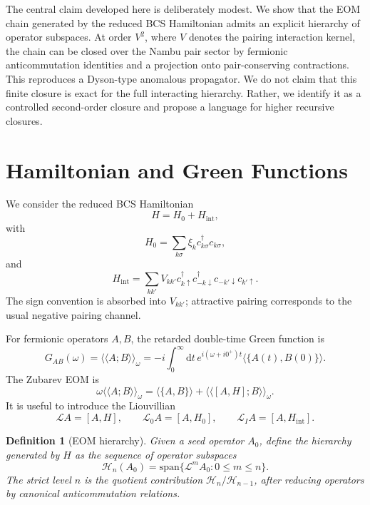 \documentclass[aps,prb,reprint,superscriptaddress,nofootinbib]{revtex4-2}
\newtheorem{definition}{Definition}
\newcommand{\Liouv}{\mathcal{L}}
\newcommand{\Hh}{\mathcal{H}}
\newcommand{\dif}{\mathrm{d}}
\begin{document}
The central claim developed here is deliberately modest. We show that the EOM chain generated by the reduced BCS Hamiltonian admits an explicit hierarchy of operator subspaces. At order \(V^2\), where \(V\) denotes the pairing interaction kernel, the chain can be closed over the Nambu pair sector by fermionic anticommutation identities and a projection onto pair-conserving contractions. This reproduces a Dyson-type anomalous propagator. We do not claim that this finite closure is exact for the full interacting hierarchy. Rather, we identify it as a controlled second-order closure and propose a language for higher recursive closures.

\section{Hamiltonian and Green Functions}

We consider the reduced BCS Hamiltonian
\begin{equation}
H = H_0 + H_{\mathrm{int}},
\end{equation}
with
\begin{equation}
H_0 = \sum_{k\sigma}\xi_k c^\dagger_{k\sigma}c_{k\sigma},
\end{equation}
and
\begin{equation}
H_{\mathrm{int}}
= \sum_{kk'} V_{kk'}
c^\dagger_{k\uparrow}c^\dagger_{-k\downarrow}
c_{-k'\downarrow}c_{k'\uparrow}.
\label{eq:bcs-hint}
\end{equation}
The sign convention is absorbed into \(V_{kk'}\); attractive pairing corresponds to the usual negative pairing channel.

For fermionic operators \(A,B\), the retarded double-time Green function is
\begin{equation}
G_{AB}(\omega)
= \langle\langle A;B\rangle\rangle_\omega
= -i\int_0^\infty \dif t\, e^{i(\omega+i0^+)t}
\langle \{A(t),B(0)\}\rangle .
\end{equation}
The Zubarev EOM is
\begin{equation}
\omega \langle\langle A;B\rangle\rangle_\omega
= \langle\{A,B\}\rangle
+ \langle\langle [A,H];B\rangle\rangle_\omega .
\label{eq:zubarev}
\end{equation}
It is useful to introduce the Liouvillian
\begin{equation}
\Liouv A = [A,H],\qquad
\Liouv_0 A=[A,H_0],\qquad
\Liouv_I A=[A,H_{\mathrm{int}}].
\end{equation}

\begin{definition}[EOM hierarchy]
Given a seed operator \(A_0\), define the hierarchy generated by \(H\) as the sequence of operator subspaces
\begin{equation}
\Hh_n(A_0)=\mathrm{span}\{\Liouv^m A_0:0\le m\le n\}.
\end{equation}
The strict level \(n\) is the quotient contribution
\(\Hh_n/\Hh_{n-1}\), after reducing operators by canonical anticommutation relations.
\end{definition}
\end{document}

